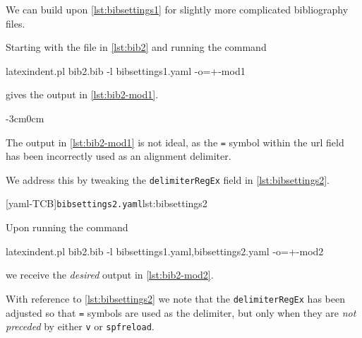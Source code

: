\documentclass[10pt]{article}
\newenvironment{widepage}{\begin{adjustwidth}{-3cm}{0cm}}{\end{adjustwidth}}
\begin{document}
 \begin{example}
 We can build upon \cref{lst:bibsettings1} for slightly more complicated bibliography
 files.

 Starting with the file in \cref{lst:bib2} and running the command

 \begin{commandshell}
latexindent.pl bib2.bib -l bibsettings1.yaml -o=+-mod1 
   \end{commandshell}

 gives the output in \cref{lst:bib2-mod1}.

 \begin{widepage}
 \end{widepage}

 The output in \cref{lst:bib2-mod1} is not ideal, as the \texttt{=} symbol within the url
 field has been incorrectly used as an alignment delimiter.

 We address this by tweaking the \texttt{delimiterRegEx} field in
 \cref{lst:bibsettings2}.

 [yaml-TCB]{\texttt{bibsettings2.yaml}}{lst:bibsettings2}

 Upon running the command

 \begin{commandshell}
latexindent.pl bib2.bib -l bibsettings1.yaml,bibsettings2.yaml -o=+-mod2 
         \end{commandshell}

 we receive the \emph{desired} output in \cref{lst:bib2-mod2}.


 With reference to \cref{lst:bibsettings2} we note that the \texttt{delimiterRegEx} has
 been adjusted so that \texttt{=} symbols are used as the delimiter, but only when they
 are \emph{not preceded} by either \texttt{v} or \texttt{spfreload}.
 \end{example}
\end{document}
